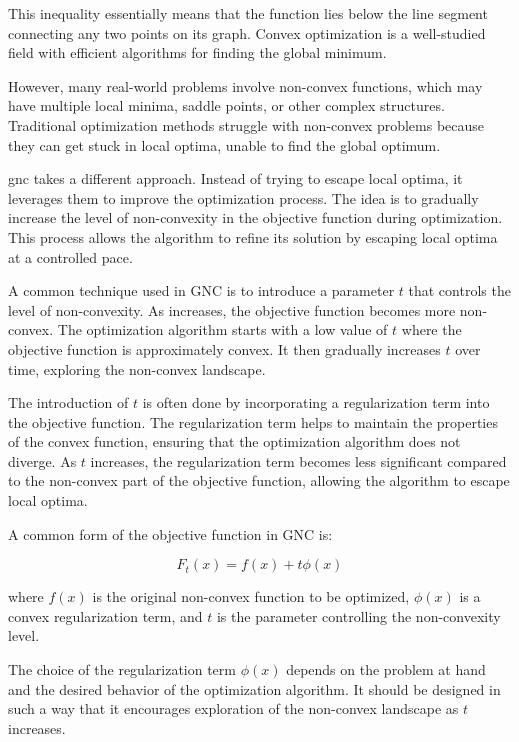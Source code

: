 This inequality essentially means that the function lies below the line segment connecting any two points on its graph. Convex optimization is a well-studied field with efficient algorithms for finding the global minimum.

However, many real-world problems involve non-convex functions, which may have multiple local minima, saddle points, or other complex structures. Traditional optimization methods struggle with non-convex problems because they can get stuck in local optima, unable to find the global optimum.

\gls{gnc} takes a different approach. Instead of trying to escape local optima, it leverages them to improve the optimization process. The idea is to gradually increase the level of non-convexity in the objective function during optimization. This process allows the algorithm to refine its solution by escaping local optima at a controlled pace.

A common technique used in GNC is to introduce a parameter $t$ that controls the level of non-convexity. As  increases, the objective function becomes more non-convex. The optimization algorithm starts with a low value of $t$ where the objective function is approximately convex. It then gradually increases $t$ over time, exploring the non-convex landscape.

The introduction of $t$ is often done by incorporating a regularization term into the objective function. The regularization term helps to maintain the properties of the convex function, ensuring that the optimization algorithm does not diverge. As $t$ increases, the regularization term becomes less significant compared to the non-convex part of the objective function, allowing the algorithm to escape local optima.

A common form of the objective function in GNC is:

\begin{equation}
	F_t(x) = f(x) + t\phi(x)
\end{equation}

where $f(x)$ is the original non-convex function to be optimized, $\phi(x)$ is a convex regularization term, and $t$ is the parameter controlling the non-convexity level.

The choice of the regularization term $\phi(x)$ depends on the problem at hand and the desired behavior of the optimization algorithm. It should be designed in such a way that it encourages exploration of the non-convex landscape as $t$ increases.


